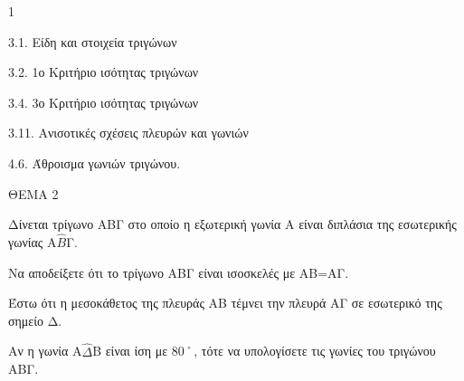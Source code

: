 \begin{ylh}{1}
    \item 3.1. Είδη και στοιχεία τριγώνων
    \item 3.2. 1ο Κριτήριο ισότητας τριγώνων
    \item 3.4. 3ο Κριτήριο ισότητας τριγώνων
    \item 3.11. Ανισοτικές σχέσεις πλευρών και γωνιών
    \item 4.6. Άθροισμα γωνιών τριγώνου.
\end{ylh}

ΘΕΜΑ 2

Δίνεται τρίγωνο ΑΒΓ στο οποίο η εξωτερική γωνία Α είναι διπλάσια της εσωτερικής γωνίας Α$\widehat{Β}$Γ.

\begin{alist}
\item Να αποδείξετε ότι το τρίγωνο ΑΒΓ είναι ισοσκελές με ΑΒ=ΑΓ. 

\item Έστω ότι η μεσοκάθετος της πλευράς ΑΒ τέμνει την πλευρά ΑΓ σε εσωτερικό της σημείο Δ.

Αν η γωνία Α$\widehat{\Delta}$Β είναι ίση με 80˚, τότε να υπολογίσετε τις γωνίες του τριγώνου ΑΒΓ.



\begin{center}
\end{center}
\end{alist}
